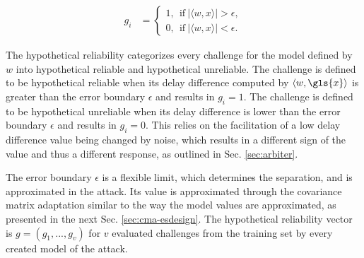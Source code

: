 \begin{equation}
\begin{aligned}
g_i &=
\begin{cases}
1,\ \ \text{if}\ |\langle w, x \rangle| > \epsilon,\\
0,\ \ \text{if}\ |\langle w, x \rangle| < \epsilon. \label{equ:hypotheticalreliability}
\end{cases}
\end{aligned}
\end{equation}

The hypothetical reliability categorizes every challenge for the model defined by $w$ into hypothetical reliable and hypothetical unreliable. %
The challenge is defined to be hypothetical reliable when its delay difference computed by $\langle w, \gls{x} \rangle$ is greater than the error boundary $\epsilon$ and results in $g_i = 1$.
The challenge is defined to be hypothetical unreliable when its delay difference is lower than the error boundary $\epsilon$ and results in $g_i = 0$. %
This relies on the facilitation of a low delay difference value being changed by noise, which results in a different sign of the value and thus a different response, as outlined in Sec. \ref{sec:arbiter}. 

The error boundary $\epsilon$ is a flexible limit, which determines the separation, and is approximated in the attack.
Its value is approximated through the covariance matrix adaptation similar to the way the model values are approximated, as presented in the next Sec. \ref{sec:cma-esdesign}.
The hypothetical reliability vector is $g = (g_1, ..., g_v)$ for $v$ evaluated challenges from the training set by every created model of the attack.


